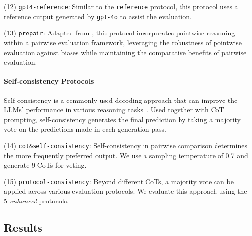 \documentclass[11pt]{article}
\begin{document}
\noindent (12) \texttt{gpt4-reference}: Similar to the \texttt{reference} protocol, this protocol uses a reference output generated by \texttt{gpt-4o} to assist the evaluation.
% 

\noindent (13) \texttt{prepair}: Adapted from \citet{jeong2024prepair}, this protocol incorporates pointwise reasoning within a pairwise evaluation framework, leveraging the robustness of pointwise evaluation against biases while maintaining the comparative benefits of pairwise evaluation. 
%


\paragraph{Self-consistency Protocols}
Self-consistency is a commonly used decoding approach that can improve the LLMs' performance in various reasoning tasks~\cite{wang2023selfconsistency}.
Used together with CoT prompting, self-consistency generates the final prediction by taking a majority vote on the predictions made in each generation pass.

\noindent (14) \texttt{cot\&self-consistency}:
Self-consistency in pairwise comparison determines the more frequently preferred output. 
We use a sampling temperature of 0.7 and generate 9 CoTs for voting.


\noindent (15) \texttt{protocol-consistency}:
Beyond different CoTs, a majority vote can be applied across various evaluation protocols.
We evaluate this approach using the 5 \textit{enhanced} protocols.

% 

% 

% 


\subsection{Results}
\label{subsec:protocol-overall}
\end{document}

